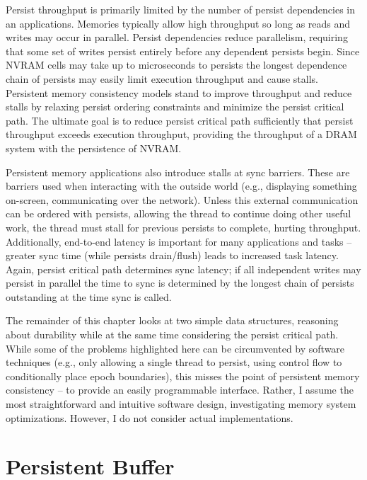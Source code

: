 Persist throughput is primarily limited by the number of persist dependencies in an applications.
Memories typically allow high throughput so long as reads and writes may occur in parallel.
Persist dependencies reduce parallelism, requiring that some set of writes persist entirely before any dependent persists begin.
Since NVRAM cells may take up to microseconds to persists the longest dependence chain of persists may easily limit execution throughput and cause stalls.
Persistent memory consistency models stand to improve throughput and reduce stalls by relaxing persist ordering constraints and minimize the persist critical path.
The ultimate goal is to reduce persist critical path sufficiently that persist throughput exceeds execution throughput, providing the throughput of a DRAM system with the persistence of NVRAM.

Persistent memory applications also introduce stalls at sync barriers.
These are barriers used when interacting with the outside world (e.g., displaying something on-screen, communicating over the network).
Unless this external communication can be ordered with persists, allowing the thread to continue doing other useful work, the thread must stall for previous persists to complete, hurting throughput.
Additionally, end-to-end latency is important for many applications and tasks -- greater sync time (while persists drain/flush) leads to increased task latency.
Again, persist critical path determines sync latency; if all independent writes may persist in parallel the time to sync is determined by the longest chain of persists outstanding at the time sync is called.

The remainder of this chapter looks at two simple data structures, reasoning about durability while at the same time considering the persist critical path.
While some of the problems highlighted here can be circumvented by software techniques (e.g., only allowing a single thread to persist, using control flow to conditionally place epoch boundaries), this misses the point of persistent memory consistency -- to provide an easily programmable interface.
Rather, I assume the most straightforward and intuitive software design, investigating memory system optimizations.
However, I do not consider actual implementations.

\section{Persistent Buffer}
\label{sec:PMC_patterns:Buffer}

